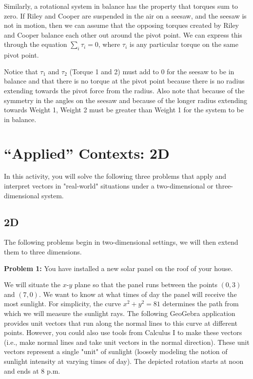 \documentclass{ximera}
\begin{document}

Similarly, a rotational system in balance has the property that torques sum to zero. If Riley and Cooper are suspended in the air on a seesaw, and the seesaw is not in motion, then we can assume that the opposing torques created by Riley and Cooper balance each other out around the pivot point. We can express this through the equation $\sum_i\tau_i=0$, where $\tau_i$ is any particular torque on the same pivot point.


Notice that $\tau_1$ and $\tau_2$ (Torque 1 and 2) must add to 0 for the seesaw to be in balance and that there is no torque at the pivot point because there is no radius extending towards the pivot force from the radius. Also note that because of the symmetry in the angles on the seesaw and because of the longer radius extending towards Weight 1, Weight 2 must be greater than Weight 1 for the system to be in balance.

\section*{``Applied'' Contexts: 2D}

In this activity, you will solve the following three problems that apply and interpret vectors in "real-world" situations under a two-dimensional or three-dimensional system.

\subsection*{2D}

The following problems begin in two-dimensional settings, we will then extend them to three dimensions.


\textbf{Problem 1:} You have installed a new solar panel on the roof of your house.

We will situate the $x$-$y$ plane so that the panel runs between the points $(0,3)$ and $(7,0)$. We want to know at what times of day the panel will receive the most sunlight. For simplicity, the curve $x^2+y^2=81$ determines the path from which we will measure the sunlight rays. The following GeoGebra application provides unit vectors that run along the normal lines to this curve at different points. However, you could also use tools from Calculus I to make these vectors (i.e., make normal lines and take unit vectors in the normal direction). These unit vectors represent a single "unit" of sunlight (loosely modeling the notion of sunlight intensity at varying times of day). The depicted rotation starts at noon and ends at 8 p.m.
\end{document}
